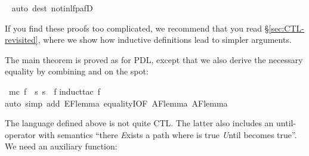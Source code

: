 \begin{isabellebody}
\isamarkuptrue%
\ \isamarkupfalse%
{}auto\ dest{}\ not{}in{}lfp{}afD{}\isanewline
{}\isamarkupfalse%
%
\endisatagproof
{\isafoldproof}%
%
\isadelimproof
%
\endisadelimproof
%
\begin{isamarkuptext}%
If you find these proofs too complicated, we recommend that you read
\S\ref{sec:CTL-revisited}, where we show how inductive definitions lead to
simpler arguments.

The main theorem is proved as for PDL, except that we also derive the
necessary equality  by combining
 and  on the spot:%
\end{isamarkuptext}%
\isamarkuptrue%
\isamarkupfalse%
\ {}mc\ f\ {}\ {}s{}\ s\ {}\ f{}{}\isanewline
%
\isadelimproof
%
\endisadelimproof
%
\isatagproof
{}\isamarkupfalse%
{}induct{}tac\ f{}\isanewline
{}\isamarkupfalse%
{}auto\ simp\ add{}\ EF{}lemma\ equalityI{}OF\ AF{}lemma{}\ AF{}lemma{}{}{}\isanewline
{}\isamarkupfalse%
%
\endisatagproof
{\isafoldproof}%
%
\isadelimproof
%
\endisadelimproof
%
\begin{isamarkuptext}%
The language defined above is not quite CTL\@. The latter also includes an
until-operator  with semantics ``there \emph{E}xists a path
where  is true \emph{U}ntil  becomes true''.  We need
an auxiliary function:%

\end{isamarkuptext}
\end{isabellebody}
